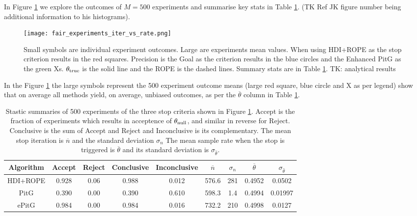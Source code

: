 In Figure \ref{fig:fair_iter_vs_rate} we explore the outcomes of $M=500$
experiments and summarise key stats in Table \ref{tab:fair_iter_vs_rate}. (TK Ref JK figure number being additional information to his histograms).


\begin{figure}[h!]
  \centering
  \texttt{[image: fair\_experiments\_iter\_vs\_rate.png]}
  \caption{Small symbols are individual experiment outcomes. Large are experiments
  mean values. When using HDI+ROPE as the stop criterion results in the red squares.
  Precision is the Goal as the criterion results in the blue circles
  and the Enhanced PitG as the green Xs. $\theta_{\rm true}$ is the solid line and
  the ROPE is the dashed lines. Summary stats are in Table \ref{tab:fair_iter_vs_rate}. TK: analytical results
  }
  \label{fig:fair_iter_vs_rate}
\end{figure}

In the Figure \ref{fig:fair_iter_vs_rate} the large symbols represent the 500 experiment outcome means 
(large red square, blue circle and X as per legend) show
that on average all methods yield, on average, unbiased outcomes, as per the
$\overline{\theta}$ column in Table \ref{tab:fair_iter_vs_rate}.


\begin{table}[h!]\label{tab:fair_iter_vs_rate}
  \begin{center}
  \begin{tabular}{c|c|c|c|c|c|c|c|c}
    \hline
    Algorithm & Accept & Reject & Conclusive & Inconclusive & $\overline{n}$ & $\sigma_n$ & $\overline{\theta}$ & $\sigma_{\hat{\theta}}$\\
    \hline
    HDI+ROPE & 0.928 & 0.06 & 0.988 & 0.012 & 576.6 & 281 & 0.4952 & 0.0502 \\
    PitG & 0.390 & 0.00 & 0.390 & 0.610 & 598.3 & 1.4 & 0.4994 & 0.01997 \\
    ePitG & 0.984 & 0.00 & 0.984 & 0.016 & 732.2 & 210 & 0.4998 & 0.0127\\
    \hline
  \end{tabular}
  \caption{Stastic summaries of 500 experiments of the three stop criteria shown in Figure \ref{fig:fair_iter_vs_rate}. Accept
  is the fraction of experiments which results in acceptence of $\theta_{\rm null}$,
  and similar in reverse for Reject. Conclusive is the sum of Accept and Reject and Inconclusive is its complementary. The mean stop iteration is $\overline{n}$ and the standard deviation $\sigma_n$
  The mean sample rate when the stop is triggered is $\overline{\theta}$ and its standard deviation is $\sigma_{\hat{\theta}}$.
  }
\end{center}
\end{table}

